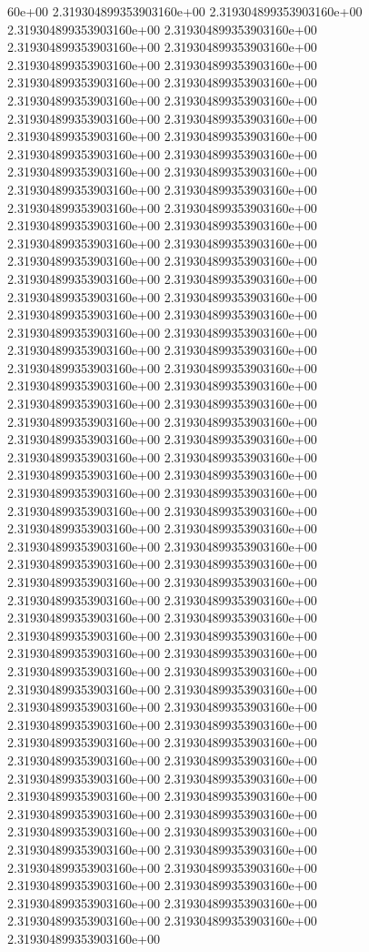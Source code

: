60e+00	2.319304899353903160e+00	2.319304899353903160e+00	2.319304899353903160e+00	2.319304899353903160e+00	2.319304899353903160e+00	2.319304899353903160e+00	2.319304899353903160e+00	2.319304899353903160e+00	2.319304899353903160e+00	2.319304899353903160e+00	2.319304899353903160e+00	2.319304899353903160e+00	2.319304899353903160e+00	2.319304899353903160e+00	2.319304899353903160e+00	2.319304899353903160e+00	2.319304899353903160e+00	2.319304899353903160e+00	2.319304899353903160e+00	2.319304899353903160e+00	2.319304899353903160e+00	2.319304899353903160e+00	2.319304899353903160e+00	2.319304899353903160e+00	2.319304899353903160e+00	2.319304899353903160e+00	2.319304899353903160e+00	2.319304899353903160e+00	2.319304899353903160e+00	2.319304899353903160e+00	2.319304899353903160e+00	2.319304899353903160e+00	2.319304899353903160e+00	2.319304899353903160e+00	2.319304899353903160e+00	2.319304899353903160e+00	2.319304899353903160e+00	2.319304899353903160e+00	2.319304899353903160e+00	2.319304899353903160e+00	2.319304899353903160e+00	2.319304899353903160e+00	2.319304899353903160e+00	2.319304899353903160e+00	2.319304899353903160e+00	2.319304899353903160e+00	2.319304899353903160e+00	2.319304899353903160e+00	2.319304899353903160e+00	2.319304899353903160e+00	2.319304899353903160e+00	2.319304899353903160e+00	2.319304899353903160e+00	2.319304899353903160e+00	2.319304899353903160e+00	2.319304899353903160e+00	2.319304899353903160e+00	2.319304899353903160e+00	2.319304899353903160e+00	2.319304899353903160e+00	2.319304899353903160e+00	2.319304899353903160e+00	2.319304899353903160e+00	2.319304899353903160e+00	2.319304899353903160e+00	2.319304899353903160e+00	2.319304899353903160e+00	2.319304899353903160e+00	2.319304899353903160e+00	2.319304899353903160e+00	2.319304899353903160e+00	2.319304899353903160e+00	2.319304899353903160e+00	2.319304899353903160e+00	2.319304899353903160e+00	2.319304899353903160e+00	2.319304899353903160e+00	2.319304899353903160e+00	2.319304899353903160e+00	2.319304899353903160e+00	2.319304899353903160e+00	2.319304899353903160e+00	2.319304899353903160e+00	2.319304899353903160e+00	2.319304899353903160e+00	2.319304899353903160e+00	2.319304899353903160e+00	2.319304899353903160e+00	2.319304899353903160e+00	2.319304899353903160e+00	2.319304899353903160e+00	2.319304899353903160e+00	2.319304899353903160e+00	2.319304899353903160e+00	2.319304899353903160e+00	2.319304899353903160e+00	2.319304899353903160e+00	2.319304899353903160e+00	2.319304899353903160e+00	2.319304899353903160e+00	2.319304899353903160e+00	2.319304899353903160e+00	2.319304899353903160e+00	2.319304899353903160e+00	2.319304899353903160e+00

